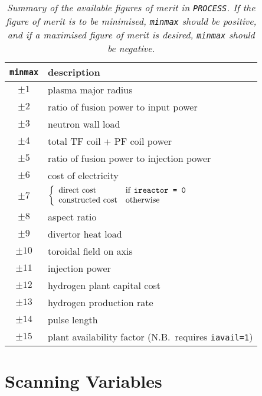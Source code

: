 \documentclass[11pt,a4paper]{report}
\newcommand{\process}{\mbox{\texttt{PROCESS}}}
\begin{document}
\begin{table}[tbph]
\begin{center}

\begin{tabular}{||c|l||} \hline
\texttt{minmax} & description \\ \hline
$\pm 1 $        & plasma major radius \\
$\pm 2 $        & ratio of fusion power to input power \\
$\pm 3 $        & neutron wall load \\
$\pm 4 $        & total TF coil + PF coil power \\
$\pm 5 $        & ratio of fusion power to injection power \\
$\pm 6 $        & cost of electricity \\
$\pm 7 $        & 
$ \left\{ \begin{array}{ll}
 \mbox{direct cost} & \mbox{if \texttt{ireactor = 0}} \\
 \mbox{constructed cost} & \mbox{otherwise}
\end{array} \right. $ \\
$\pm 8 $        & aspect ratio \\
$\pm 9 $        & divertor heat load \\
$\pm 10$        & toroidal field on axis \\
$\pm 11$        & injection power \\
$\pm 12$        & hydrogen plant capital cost \\
$\pm 13$        & hydrogen production rate \\
$\pm 14$        & pulse length \\
$\pm 15$        & plant availability factor (N.B.\ requires \texttt{iavail=1}) \\
\hline
\end{tabular}
\end{center}
\caption[List of figures of merit]
{\label{tab:foms}
  \textit{Summary of the available figures of merit in \process. If the figure
    of merit is to be minimised, \texttt{minmax} should be positive, and if a maximised
    figure of merit is desired, \texttt{minmax} should be negative.}
}
\end{table}

\section{Scanning Variables}
\label{sec:scans}
\end{document}
